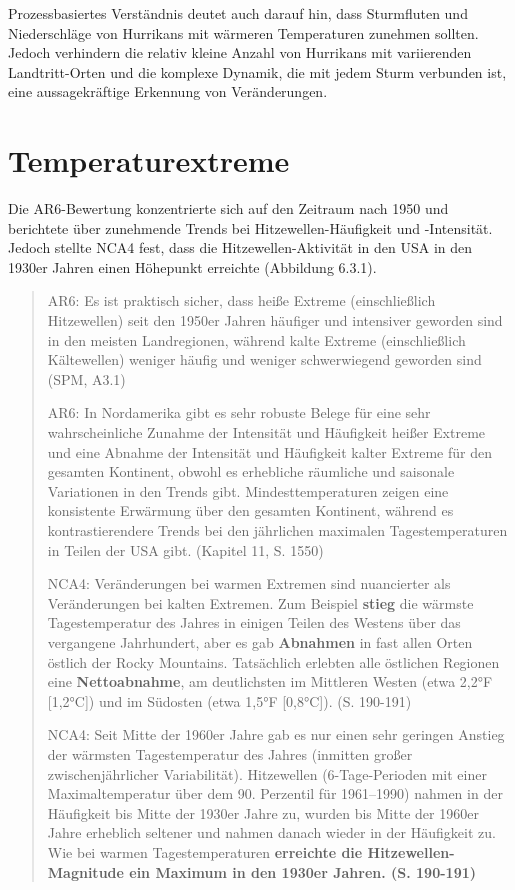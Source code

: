 \documentclass[12pt,paper=a4,DIV=12,parskip=never,chapterprefix=false,headings=standardclasses]{scrreprt}
\begin{document}
Prozessbasiertes Verständnis deutet auch darauf hin, dass Sturmfluten und Niederschläge von Hurrikans mit wärmeren Temperaturen zunehmen sollten. Jedoch verhindern die relativ kleine Anzahl von Hurrikans mit variierenden Landtritt-Orten und die komplexe Dynamik, die mit jedem Sturm verbunden ist, eine aussagekräftige Erkennung von Veränderungen.

\section{Temperaturextreme}
Die AR6-Bewertung konzentrierte sich auf den Zeitraum nach 1950 und berichtete über zunehmende Trends bei Hitzewellen-Häufigkeit und -Intensität. Jedoch stellte NCA4 fest, dass die Hitzewellen-Aktivität in den USA in den 1930er Jahren einen Höhepunkt erreichte (Abbildung 6.3.1).

\begin{quote}
AR6: Es ist praktisch sicher, dass heiße Extreme (einschließlich Hitzewellen) seit den 1950er Jahren häufiger und intensiver geworden sind in den meisten Landregionen, während kalte Extreme (einschließlich Kältewellen) weniger häufig und weniger schwerwiegend geworden sind (SPM, A3.1)

AR6: In Nordamerika gibt es sehr robuste Belege für eine sehr wahrscheinliche Zunahme der Intensität und Häufigkeit heißer Extreme und eine Abnahme der Intensität und Häufigkeit kalter Extreme für den gesamten Kontinent, obwohl es erhebliche räumliche und saisonale Variationen in den Trends gibt. Mindesttemperaturen zeigen eine konsistente Erwärmung über den gesamten Kontinent, während es kontrastierendere Trends bei den jährlichen maximalen Tagestemperaturen in Teilen der USA gibt. (Kapitel 11, S. 1550)

NCA4: Veränderungen bei warmen Extremen sind nuancierter als Veränderungen bei kalten Extremen. Zum Beispiel \textbf{stieg} die wärmste Tagestemperatur des Jahres in einigen Teilen des Westens über das vergangene Jahrhundert, aber es gab \textbf{Abnahmen} in fast allen Orten östlich der Rocky Mountains. Tatsächlich erlebten alle östlichen Regionen eine \textbf{Nettoabnahme}, am deutlichsten im Mittleren Westen (etwa 2,2°F [1,2°C]) und im Südosten (etwa 1,5°F [0,8°C]). (S. 190-191)

NCA4: Seit Mitte der 1960er Jahre gab es nur einen sehr geringen Anstieg der wärmsten Tagestemperatur des Jahres (inmitten großer zwischenjährlicher Variabilität). Hitzewellen (6-Tage-Perioden mit einer Maximaltemperatur über dem 90. Perzentil für 1961–1990) nahmen in der Häufigkeit bis Mitte der 1930er Jahre zu, wurden bis Mitte der 1960er Jahre erheblich seltener und nahmen danach wieder in der Häufigkeit zu. Wie bei warmen Tagestemperaturen \textbf{erreichte die Hitzewellen-Magnitude ein Maximum in den 1930er Jahren. (S. 190-191)}
\end{quote}
\end{document}
